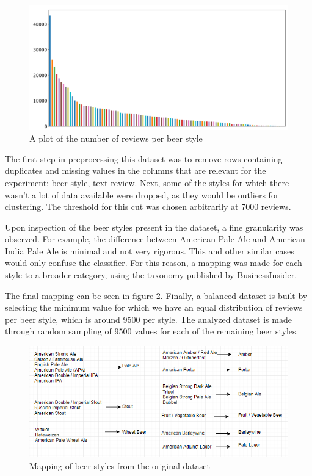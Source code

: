\documentclass[12pt]{article}
\begin{document}
	\begin{figure}[h]
		\includegraphics[width=\linewidth]{resources/InitialDistribution.png}
		\caption{A plot of the number of reviews per beer style}
		\label{fig:initialDistribution}
	\end{figure}

	The first step in preprocessing this dataset was to remove rows containing duplicates and missing values in the columns that are relevant for the experiment: beer style, text review. Next, some of the styles for which there wasn't a lot of data available were dropped, as they would be outliers for clustering. The threshold for this cut was chosen arbitrarily at 7000 reviews. 
	
	Upon inspection of the beer styles present in the dataset, a fine granularity was observed. For example, the difference between American Pale Ale and American India Pale Ale is minimal and not very rigorous. This and other similar cases would only confuse the classifier. For this reason, a mapping was made for each style to a broader category, using the taxonomy published by BusinessInsider\cite{BeerTaxonomy}. 
	
	The final mapping can be seen in figure \ref{fig:styleMapping}. Finally, a balanced dataset is built by selecting the minimum value for which we have an equal distribution of reviews per beer style, which is around 9500 per style. The analyzed dataset is made through random sampling of 9500 values for each of the remaining beer styles.
	
	\begin{figure}
		\includegraphics[width=\linewidth]{resources/MappingDiagram.png}
		\caption{Mapping of beer styles from the original dataset}
		\label{fig:styleMapping}
	\end{figure}
\end{document}
